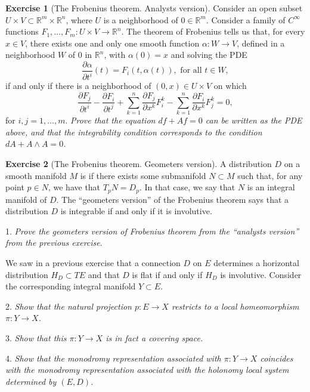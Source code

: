 \documentclass[12pt,a4paper]{amsbook}
\theoremstyle{remark} \newtheorem{rmk}[thm]{Remark}
\theoremstyle{definition} \newtheorem{defn}[thm]{Definition}
\theoremstyle{definition} \newtheorem{ex}[thm]{Example}
\theoremstyle{definition} \newtheorem{ej}{Exercise}
\let\emph\relax
\newcommand{\RR}{\mathbb R}
\newcommand{\bbR}{\mathbb R}
\begin{document}
\begin{ej}[The Frobenius theorem. Analysts version] \label{ej:Frobenius}
Consider an open subset $U\times V\subset \bbR^m \times \bbR^n$, where  $U$ is a neighborhood of $0\in \bbR^m$. Consider a family of $C^\infty$ functions $F_1,\dots,F_m:U\times V\rightarrow \RR^n$. The theorem of Frobenius tells us	that, for every $x \in V$, there exists one and only one smooth function  $\alpha:W\rightarrow V$, defined in a neighborhood  $W$ of $0$ in $\bbR^n$, with  $\alpha(0)=x$ and solving the PDE
\begin{equation*}
\frac{\partial \alpha}{\partial t^i}(t)=F_i(t,\alpha(t)), \text{ for all } t\in W,
\end{equation*} 
if and only if there is a neighborhood of $(0,x)\in U\times V$ on which
 \begin{equation*}
\frac{\partial F_j}{\partial t^i} - \frac{\partial F_i}{\partial t^j} + \sum_{k=1}^n \frac{\partial F_j}{\partial x^k} F_i^k - \sum_{k=1}^n \frac{\partial F_i}{\partial x^k} F_j^k  =0,
\end{equation*} 
for $i,j=1,\dots,m$.
\textit{Prove that the equation $df+ Af=0$ can be written as the PDE above, and that the integrability condition corresponds to the condition $dA + A\wedge A = 0$.}
\end{ej}

\begin{ej}[The Frobenius theorem. Geometers version]
A distribution $D$ on a smooth manifold $M$ is \emph{integrable} if there exists some submanifold $N\subset M$ such that, for any point  $p\in N$, we have that  $T_pN=D_p$. In that case, we say that  $N$ is an integral manifold of $D$. The ``geometers version'' of the Frobenius theorem says that a distribution $D$ is integrable if and only if it is involutive.

1. \textit{Prove the geometers version of Frobenius theorem from the ``analysts version'' from the previous exercise}.

We saw in a previous exercise that a connection $D$ on  $E$ determines a horizontal distribution $H_D \subset TE$ and that $D$ is flat if and only if  $H_D$ is involutive. Consider the corresponding integral manifold $Y\subset E$.

2.\textit{	 Show that the natural projection $p:E\rightarrow X$ restricts to a local homeomorphism  $\pi:Y\rightarrow X$. }

3.\textit{	 Show that this $\pi:Y\rightarrow X$ is in fact a covering space.}

4.\textit{	 Show that the monodromy representation associated with $\pi:Y\rightarrow X$ coincides with the monodromy representation associated with the holonomy local system determined by $(E,D)$.}
\end{ej}
\end{document}
